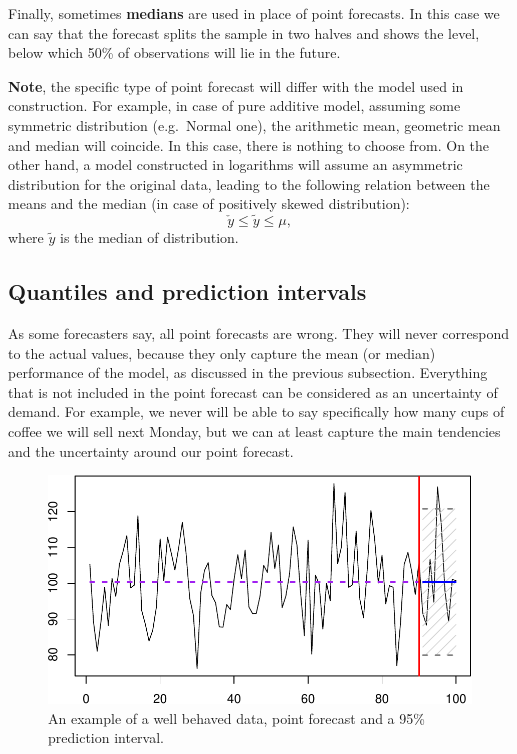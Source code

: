 \documentclass[
]{book}
\theoremstyle{definition}
\theoremstyle{definition}
\theoremstyle{definition}
\theoremstyle{definition}
\theoremstyle{remark}
\begin{document}
Finally, sometimes \textbf{medians} are used in place of point forecasts. In this case we can say that the forecast splits the sample in two halves and shows the level, below which 50\% of observations will lie in the future.

\textbf{Note}, the specific type of point forecast will differ with the model used in construction. For example, in case of pure additive model, assuming some symmetric distribution (e.g.~Normal one), the arithmetic mean, geometric mean and median will coincide. In this case, there is nothing to choose from. On the other hand, a model constructed in logarithms will assume an asymmetric distribution for the original data, leading to the following relation between the means and the median (in case of positively skewed distribution):
\begin{equation}
    \check{y} \leq \tilde{y}\leq \mu ,
    \label{eq:GeoAndArithMeansAndMedian}
\end{equation}
where \(\tilde{y}\) is the median of distribution.

\hypertarget{typesOfForecastsInterval}{%
\subsection{Quantiles and prediction intervals}\label{typesOfForecastsInterval}}

As some forecasters say, all point forecasts are wrong. They will never correspond to the actual values, because they only capture the mean (or median) performance of the model, as discussed in the previous subsection. Everything that is not included in the point forecast can be considered as an uncertainty of demand. For example, we never will be able to say specifically how many cups of coffee we will sell next Monday, but we can at least capture the main tendencies and the uncertainty around our point forecast.

\begin{figure}
\centering
\includegraphics{adam_files/figure-latex/adamExampleNormal-1.pdf}
\caption{\label{fig:adamExampleNormal}An example of a well behaved data, point forecast and a 95\% prediction interval.}
\end{figure}
\end{document}
